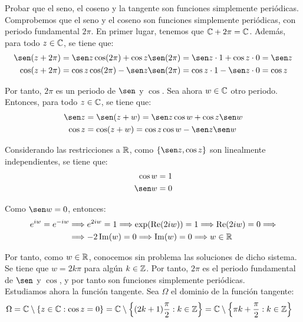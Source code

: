 \begin{ejercicio}
    Probar que el seno, el coseno y la tangente son funciones simplemente periódicas.\\

    Comprobemos que el seno y el coseno son funciones simplemente periódicas, con periodo fundamental $2\pi$. En primer lugar, tenemos que $\mathbb{C}+2\pi=\mathbb{C}$. Además, para todo $z\in \mathbb{C}$, se tiene que:
    \begin{align*}
        \sen(z+2\pi) &= \sen z\cos(2\pi)+\cos z\sen(2\pi) = \sen z\cdot 1 + \cos z\cdot 0 = \sen z\\
        \cos(z+2\pi) &= \cos z\cos(2\pi)-\sen z\sen(2\pi) = \cos z\cdot 1 - \sen z\cdot 0 = \cos z
    \end{align*}

    Por tanto, $2\pi$ es un periodo de $\sen$ y $\cos$. Sea ahora $w\in \mathbb{C}$ otro periodo. Entonces, para todo $z\in \mathbb{C}$, se tiene que:
    \begin{align*}
        \sen z &= \sen(z+w) = \sen z\cos w + \cos z\sen w\\
        \cos z &= \cos(z+w) = \cos z\cos w - \sen z\sen w
    \end{align*}

    Considerando las restricciones a $\mathbb{R}$, como $\{\sen z,\cos z\}$ son linealmente independientes, se tiene que:
    \begin{align*}
        \cos w &= 1 \\
        \sen w &= 0
    \end{align*}

    Como $\sen w=0$, entonces:
    \begin{align*}
        e^{iw} = e^{-iw}&\Longrightarrow e^{2iw} = 1\Longrightarrow \exp(\operatorname{Re}(2iw))=1
        \Longrightarrow \operatorname{Re}(2iw) = 0\Longrightarrow \\ &\Longrightarrow -2\operatorname{Im}(w) = 0\Longrightarrow \operatorname{Im}(w) = 0
        \Longrightarrow w\in \mathbb{R}
    \end{align*}

    Por tanto, como $w\in \mathbb{R}$, conocemos sin problema las soluciones de dicho sistema. Se tiene que $w=2k\pi$ para algún $k\in \mathbb{Z}$. Por tanto, $2\pi$ es el periodo fundamental de $\sen$ y $\cos$, y por tanto son funciones simplemente periódicas.\\

    Estudiamos ahora la función tangente. Sea $\Omega$ el dominio de la función tangente:
    \begin{align*}
        \Omega &= \mathbb{C}\setminus\left\{z\in \mathbb{C} : \cos z = 0\right\} = \mathbb{C}\setminus\left\{(2k+1)\frac{\pi}{2} : k\in \mathbb{Z}\right\}
        = \mathbb{C}\setminus\left\{\pi k +\frac{\pi}{2} : k\in \mathbb{Z}\right\}
    \end{align*}
    

\end{ejercicio}
